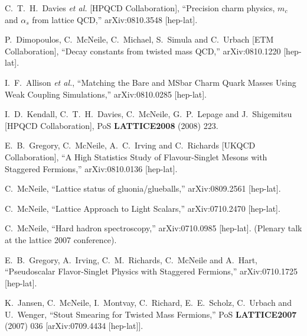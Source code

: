\begin{thebibliography}{130}
  C.~T.~H.~Davies {\it et al.}  [HPQCD Collaboration],
  ``Precision charm physics, $m_c$ and $\alpha_s$ from lattice QCD,''
  arXiv:0810.3548 [hep-lat].


  P.~Dimopoulos, C.~McNeile, C.~Michael, S.~Simula and C.~Urbach  [ETM
                  Collaboration],
  ``Decay constants from twisted mass QCD,''
  arXiv:0810.1220 [hep-lat].



  I.~F.~Allison {\it et al.},
  ``Matching the Bare and MSbar Charm Quark Masses Using Weak
  Coupling
  Simulations,''
  arXiv:0810.0285 [hep-lat].

  I.~D.~Kendall, C.~T.~H.~Davies, C.~McNeile, G.~P.~Lepage and
  J.~Shigemitsu
                  [HPQCD Collaboration],
  PoS {\bf LATTICE2008} (2008) 223.



  E.~B.~Gregory, C.~McNeile, A.~C.~Irving and C.~Richards  [UKQCD
                  Collaboration],
  ``A High Statistics Study of Flavour-Singlet Mesons with Staggered
  Fermions,''
  arXiv:0810.0136 [hep-lat].

  C.~McNeile,
  ``Lattice status of gluonia/glueballs,''
  arXiv:0809.2561 [hep-lat].


  C.~McNeile,
  ``Lattice Approach to Light Scalars,''
  arXiv:0710.2470 [hep-lat].

  C.~McNeile,
  ``Hard hadron spectroscopy,''
  arXiv:0710.0985 [hep-lat].
(Plenary talk at the lattice 2007 conference).


  E.~B.~Gregory, A.~Irving, C.~M.~Richards, C.~McNeile and A.~Hart,
  ``Pseudoscalar Flavor-Singlet Physics with Staggered Fermions,''
  arXiv:0710.1725 [hep-lat].

  K.~Jansen, C.~McNeile, I.~Montvay, C.~Richard, E.~E.~Scholz, C.~Urbach and U.~Wenger,
  ``Stout Smearing for Twisted Mass Fermions,''
  PoS {\bf LATTICE2007} (2007) 036
  [arXiv:0709.4434 [hep-lat]].


\end{thebibliography}
